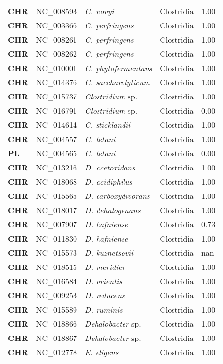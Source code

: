 \begin{adjustwidth}{-3cm}{2cm}
{\begin{supertabular}{>{\bfseries}l|p{0.1\textwidth}p{0.14\textwidth}l|l}
CHR & NC\_008593 & \textit{C. novyi} & Clostridia & 1.00\\
CHR & NC\_003366 & \textit{C. perfringens} & Clostridia & 1.00\\
CHR & NC\_008261 & \textit{C. perfringens} & Clostridia & 1.00\\
CHR & NC\_008262 & \textit{C. perfringens} & Clostridia & 1.00\\
CHR & NC\_010001 & \textit{C. phytofermentans} & Clostridia & 1.00\\
CHR & NC\_014376 & \textit{C. saccharolyticum} & Clostridia & 1.00\\
CHR & NC\_015737 & \textit{Clostridium} sp. & Clostridia & 1.00\\
CHR & NC\_016791 & \textit{Clostridium} sp. & Clostridia & 0.00\\
CHR & NC\_014614 & \textit{C. sticklandii} & Clostridia & 1.00\\
CHR & NC\_004557 & \textit{C. tetani} & Clostridia & 1.00\\
PL & NC\_004565 & \textit{C. tetani} & Clostridia & 0.00\\
CHR & NC\_013216 & \textit{D. acetoxidans} & Clostridia & 1.00\\
CHR & NC\_018068 & \textit{D. acidiphilus} & Clostridia & 1.00\\
CHR & NC\_015565 & \textit{D. carboxydivorans} & Clostridia & 1.00\\
CHR & NC\_018017 & \textit{D. dehalogenans} & Clostridia & 1.00\\
CHR & NC\_007907 & \textit{D. hafniense} & Clostridia & 0.73\\
CHR & NC\_011830 & \textit{D. hafniense} & Clostridia & 1.00\\
CHR & NC\_015573 & \textit{D. kuznetsovii} & Clostridia & nan\\
CHR & NC\_018515 & \textit{D. meridiei} & Clostridia & 1.00\\
CHR & NC\_016584 & \textit{D. orientis} & Clostridia & 1.00\\
CHR & NC\_009253 & \textit{D. reducens} & Clostridia & 1.00\\
CHR & NC\_015589 & \textit{D. ruminis} & Clostridia & 1.00\\
CHR & NC\_018866 & \textit{Dehalobacter} sp. & Clostridia & 1.00\\
CHR & NC\_018867 & \textit{Dehalobacter} sp. & Clostridia & 1.00\\
CHR & NC\_012778 & \textit{E. eligens} & Clostridia & 1.00\\

\end{supertabular}}
\end{adjustwidth}
